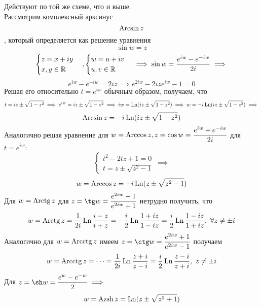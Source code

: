 \documentclass[../../main.tex]{subfiles}
\begin{document}
Действуют по той же схеме, что и выше.\\
Рассмотрим комплексный арксинус
\begin{equation}
\label{lec27:23}
\operatorname{Arcsin} z
\end{equation}, который определяется как решение уравнения
\begin{equation}
\label{lec27:24}
\sin w = z
\end{equation}
\[
\begin{cases}
	z = x + iy\\
	x, y \in \mathbb{R}
\end{cases},
\begin{cases}
	w = u + iv\\
	u, v \in \mathbb{R}
\end{cases} \implies
\sin w = \dfrac{e^{iw} - e^{-iw}}{2i} \implies\]\[
e^{iw} - e^{-iw} = 2iz \implies
e^{2iw} - 2ize^{iw} - 1 = 0
\]
Решая его относительно $ t = e^{iw} $ обычным образом, получаем, что
\[
t = iz \pm \sqrt{1 - z^2} \implies
e^{iw} = iz \pm \sqrt{1 - z^2} \implies
iw = \operatorname{Ln}(iz \pm \sqrt{1 - z^2}) \implies
w = -i\operatorname{Ln}(iz \pm \sqrt{1 - z^2}) \implies
\]
\begin{equation}
\label{lec27:25}
\operatorname{Arcsin} z = -i\operatorname{Ln}(iz\pm\sqrt{1 - z^2})
\end{equation}
Аналогично решая уравнение для $ w = \operatorname{Arccos} z, z = \cos w = 
\dfrac{e^{iw} + e^{-iw}}{2i} $ для $ t = e^{iw} $:
\[
\begin{cases}
	t^2 - 2tz + 1 = 0 \\
	t = z \pm \sqrt{z^2 - 1}
\end{cases} \implies
\] 
\begin{equation}
\label{lec27:26}
w = \operatorname{Arccos} z = -i\operatorname{Ln}(z \pm \sqrt{z^2 - 1})
\end{equation}
Для $ w = \operatorname{Arctg} z $ для $ z = \tg w = 
\dfrac{e^{2iw} - 1}{e^{2iw} + 1} $ нетрудно получить, что 
\begin{equation}
\label{lec27:27}
w = \operatorname{Arctg} z = \dfrac{1}{2i} \operatorname{Ln} \dfrac{i - z}{i + z} = 
-\dfrac{i}{2} \operatorname{Ln}\dfrac{1 + iz}{1 - iz} = 
\dfrac{i}{2} \operatorname{Ln}\dfrac{1 - iz}{1 + iz},\ \forall z \neq \pm i
\end{equation}
Аналогично для $ w = \operatorname{Arcctg} z $ имеем $ z = \ctg w = 
\dfrac{e^{2iw} + 1}{e^{2iw} - 1} $ получаем
\begin{equation}
\label{lec27:28}
w = \operatorname{Arcctg} z = \dots = \dfrac{1}{2i} \operatorname{Ln} \dfrac{z + i}{z - i} = 
\dfrac{i}{2} \operatorname{Ln} \dfrac{z - i}{z + i},\ z \neq \pm i
\end{equation}
Для $ z = \sh w = \dfrac{e^{w} - e^{-w}}{2} \implies $
\begin{equation}
\label{lec27:29}
w = \operatorname{Azsh} z = \operatorname{Ln}(z \pm \sqrt{z^2 + 1})
\end{equation}
\end{document}

